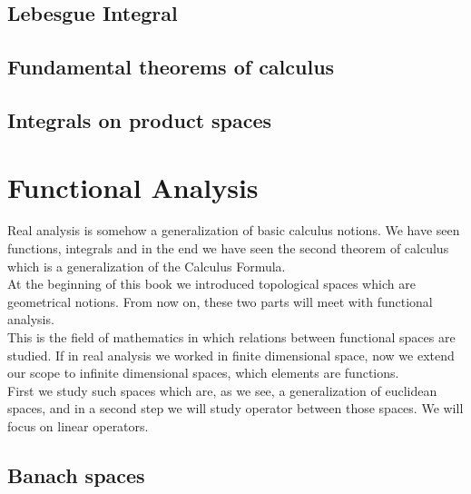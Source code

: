 \documentclass[11pt,twoside]{article}
\begin{document}
\newpage
\subsection{Lebesgue Integral}






\newpage
\subsection{Fundamental theorems of calculus}





\newpage
\subsection{Integrals on product spaces}

 


\newpage
\section{Functional Analysis}
Real analysis is somehow a generalization of basic calculus notions. We have seen functions, integrals and in the end we have seen the second theorem of calculus which is a generalization of the Calculus Formula.\\
At the beginning of this book we introduced topological spaces which are geometrical notions. From now on, these two parts will meet with functional analysis.\\
This is the field of mathematics in which relations between functional spaces are studied. If in real analysis we worked in finite dimensional space, now we extend our scope to infinite dimensional spaces, which elements are functions.\\
First we study such spaces which are, as we see, a generalization of euclidean spaces, and in a second step we will study operator between those spaces. We will focus on linear operators.

\subsection{Banach spaces}





\end{document}
